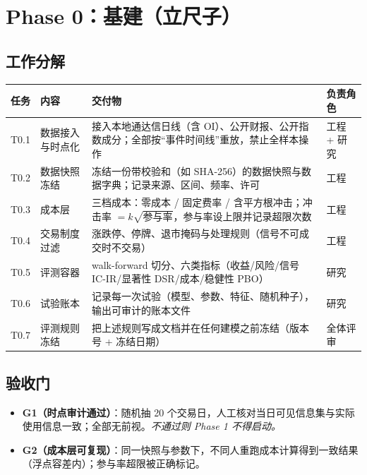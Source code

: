 \documentclass[11pt,a4paper]{ctexart}
\begin{document}
\section{Phase 0：基建（立尺子）}

\subsection{工作分解}

\begin{longtable}{@{}>{\raggedright\arraybackslash}p{1.0cm}>{\raggedright\arraybackslash}p{4.4cm}>{\raggedright\arraybackslash}p{5.6cm}>{\raggedright\arraybackslash}p{2.6cm}@{}}
\toprule
任务 & 内容 & 交付物 & 负责角色 \\
\midrule
\endhead
T0.1 & 数据接入与时点化 & 接入本地通达信日线（含 OI）、公开财报、公开指数成分；全部按“事件时间线”重放，禁止全样本操作 & 工程 + 研究 \\
T0.2 & 数据快照冻结 & 冻结一份带校验和（如 SHA-256）的数据快照与数据字典；记录来源、区间、频率、许可 & 工程 \\
T0.3 & 成本层 & 三档成本：零成本 / 固定费率 / 含平方根冲击；冲击率 $=k\sqrt{\text{参与率}}$，参与率设上限并记录超限次数 & 工程 \\
T0.4 & 交易制度过滤 & 涨跌停、停牌、退市掩码与处理规则（信号不可成交时不交易） & 工程 \\
T0.5 & 评测容器 & walk-forward 切分、六类指标（收益/风险/信号 IC-IR/显著性 DSR/成本/稳健性 PBO） & 研究 \\
T0.6 & 试验账本 & 记录每一次试验（模型、参数、特征、随机种子），输出可审计的账本文件 & 研究 \\
T0.7 & 评测规则冻结 & 把上述规则写成文档并在任何建模之前冻结（版本号 + 冻结日期） & 全体评审 \\
\bottomrule
\end{longtable}

\subsection{验收门}

\begin{itemize}
  \item \textbf{G1（时点审计通过）}：随机抽 20 个交易日，人工核对当日可见信息集与实际使用信息一致；全部无前视。\emph{不通过则 Phase 1 不得启动。}
  \item \textbf{G2（成本层可复现）}：同一快照与参数下，不同人重跑成本计算得到一致结果（浮点容差内）；参与率超限被正确标记。
\end{itemize}
\end{document}
